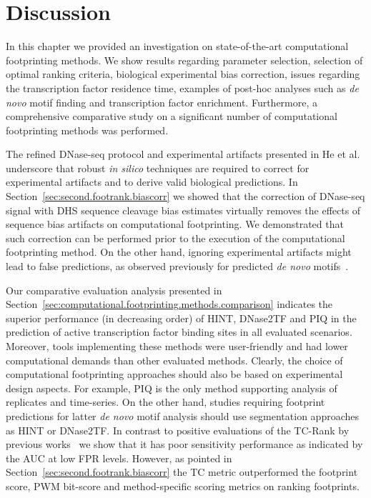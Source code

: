 \section{Discussion}
\label{sec:discussion.5}

In this chapter we provided an investigation on state-of-the-art computational footprinting methods. We show results regarding parameter selection, selection of optimal ranking criteria, biological experimental bias correction, issues regarding the transcription factor residence time, examples of post-hoc analyses such as \emph{de novo} motif finding and transcription factor enrichment. Furthermore, a comprehensive comparative study on a significant number of computational footprinting methods was performed.

The refined DNase-seq protocol and experimental artifacts presented in He et al.~\cite{he2014} underscore that robust \emph{in silico} techniques are required to correct for experimental artifacts and to derive valid biological predictions. In Section~\ref{sec:second.footrank.biascorr} we showed that the correction of DNase-seq signal with DHS sequence cleavage bias estimates virtually removes the effects of sequence bias artifacts on computational footprinting. We demonstrated that such correction can be performed prior to the execution of the computational footprinting method. On the other hand, ignoring experimental artifacts might lead to false predictions, as observed previously for predicted \emph{de novo} motifs~\cite{neph2012a,he2014}. 

Our comparative evaluation analysis presented in Section~\ref{sec:computational.footprinting.methods.comparison} indicates the superior performance (in decreasing order) of HINT, DNase2TF and PIQ in the prediction of active transcription factor binding sites in all evaluated scenarios. Moreover, tools implementing these methods were user-friendly and had lower computational demands than other evaluated methods. Clearly, the choice of computational footprinting approaches should also be based on experimental design aspects. For example, PIQ is the only method supporting analysis of replicates and time-series. On the other hand, studies requiring footprint predictions for latter \emph{de novo} motif analysis should use segmentation approaches as HINT or DNase2TF. In contrast to positive evaluations of the TC-Rank by previous works~\cite{cuellar2012,he2014} we show that it has poor sensitivity performance as indicated by the AUC at low FPR levels. However, as pointed in Section~\ref{sec:second.footrank.biascorr} the TC metric outperformed the footprint score, PWM bit-score and method-specific scoring metrics on ranking footprints.

